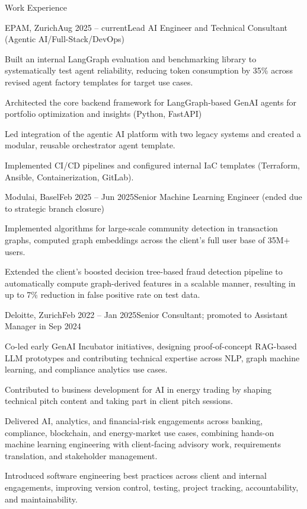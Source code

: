 \documentclass{resume_v2} %
\begin{document}
\begin{rSection}{Work Experience}
  \begin{myrSubsection}{EPAM, Zurich}{Aug 2025 -- current}{Lead AI Engineer and Technical Consultant (Agentic AI/Full-Stack/DevOps)}
    \item Built an internal LangGraph evaluation and benchmarking library to systematically test agent reliability, reducing token consumption by 35\% across revised agent factory templates for target use cases.
    \item Architected the core backend framework for LangGraph-based GenAI agents for portfolio optimization and insights (Python, FastAPI)
    \item Led integration of the agentic AI platform with two legacy systems and created a modular, reusable orchestrator agent template.
    \item Implemented CI/CD pipelines and configured internal IaC templates (Terraform, Ansible, Containerization, GitLab).
  \end{myrSubsection}

  \begin{myrSubsection}{Modulai, Basel}{Feb 2025 -- Jun 2025}{Senior Machine Learning Engineer (ended due to strategic branch closure)}
    \item Implemented algorithms for large-scale community detection in transaction graphs, computed graph embeddings across the client's full user base of 35M+ users.
    \item Extended the client's boosted decision tree-based fraud detection pipeline to automatically compute graph-derived features in a scalable manner, resulting in up to 7\% reduction in false positive rate on test data.
  \end{myrSubsection}

  \begin{myrSubsection}{Deloitte, Zurich}{Feb 2022 -- Jan 2025}{Senior Consultant; promoted to Assistant Manager in Sep 2024}
    \item Co-led early GenAI Incubator initiatives, designing proof-of-concept RAG-based LLM prototypes and contributing technical expertise across NLP, graph machine learning, and compliance analytics use cases.
    \item Contributed to business development for AI in energy trading by shaping technical pitch content and taking part in client pitch sessions.
    \item Delivered AI, analytics, and financial-risk engagements across banking, compliance, blockchain, and energy-market use cases, combining hands-on machine learning engineering with client-facing advisory work, requirements translation, and stakeholder management.
    \item Introduced software engineering best practices across client and internal engagements, improving version control, testing, project tracking, accountability, and maintainability.
  \end{myrSubsection}


\end{rSection}
\end{document}
